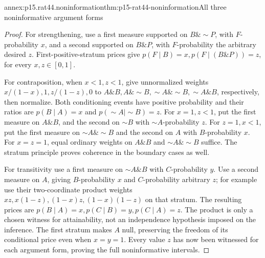 \begin{annexitem}{annex:p15.rat44.noninformation}{thm:p15-rat44-noninformation}{All three noninformative argument forms}
\begin{proof}
For strengthening, use a first measure supported on
\(B\mathbin{\&}\sim P\), with \(F\)-probability \(x\), and a
second supported on \(B\mathbin{\&}P\), with \(F\)-probability
the arbitrary desired \(z\). First-positive-stratum prices give
\(p(F\mid B)=x,p(F\mid(B\mathbin{\&}P))=z\), for every \(x,z\in[0,1]\).

For contraposition, when \(x<1,z<1\), give unnormalized weights
\(x/(1-x),1,z/(1-z),0\) to
\(A\mathbin{\&}B,A\mathbin{\&}\sim B,
  \sim A\mathbin{\&}\sim B,\sim A\mathbin{\&}B\), respectively,
then normalize.
Both conditioning events have positive probability and their ratios
are \(p(B\mid A)=x\) and \(p(\sim A\mid\sim B)=z\).
For \(x=1,z<1\), put the first measure on \(A\mathbin{\&}B\), and the
second on \(\sim B\) with \(\sim A\)-probability \(z\).
For \(z=1,x<1\), put the first measure on \(\sim A\mathbin{\&}\sim B\)
and the second on \(A\) with \(B\)-probability \(x\).
For \(x=z=1\), equal ordinary weights on \(A\mathbin{\&}B\) and
\(\sim A\mathbin{\&}\sim B\) suffice. The stratum principle proves coherence
in the boundary cases as well.

For transitivity use a first measure on \(\sim A\mathbin{\&}B\)
with \(C\)-probability \(y\). Use a second measure on \(A\),
giving \(B\)-probability \(x\) and \(C\)-probability arbitrary
\(z\); for example use their two-coordinate product weights
\(xz,x(1-z),(1-x)z,(1-x)(1-z)\) on that stratum.
The resulting prices are \(p(B\mid A)=x,p(C\mid B)=y,p(C\mid A)=z\).
The product is only a chosen witness for attainability, not an
independence hypothesis imposed on the inference. The first stratum
makes \(A\) null, preserving the freedom of its conditional price
even when \(x=y=1\). Every value \(z\) has now been witnessed
for each argument form, proving the full noninformative intervals.
\end{proof}
\end{annexitem}

